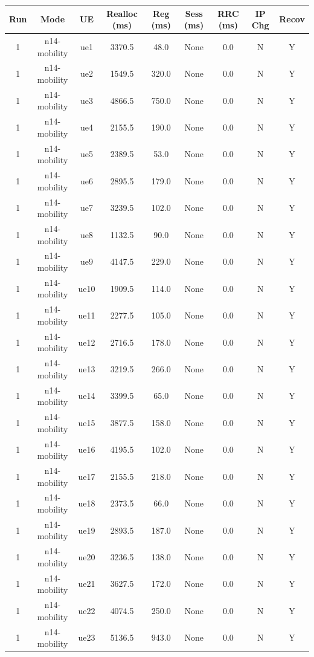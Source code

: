 \begin{table}[ht]
\centering
\begin{tabular}{|c|c|c|c|c|c|c|c|c|}
\hline
Run & Mode & UE & Realloc (ms) & Reg (ms) & Sess (ms) & RRC (ms) & IP Chg & Recov \\
\hline
1 & n14-mobility & ue1 & 3370.5 & 48.0 & None & 0.0 & N & Y \\
1 & n14-mobility & ue2 & 1549.5 & 320.0 & None & 0.0 & N & Y \\
1 & n14-mobility & ue3 & 4866.5 & 750.0 & None & 0.0 & N & Y \\
1 & n14-mobility & ue4 & 2155.5 & 190.0 & None & 0.0 & N & Y \\
1 & n14-mobility & ue5 & 2389.5 & 53.0 & None & 0.0 & N & Y \\
1 & n14-mobility & ue6 & 2895.5 & 179.0 & None & 0.0 & N & Y \\
1 & n14-mobility & ue7 & 3239.5 & 102.0 & None & 0.0 & N & Y \\
1 & n14-mobility & ue8 & 1132.5 & 90.0 & None & 0.0 & N & Y \\
1 & n14-mobility & ue9 & 4147.5 & 229.0 & None & 0.0 & N & Y \\
1 & n14-mobility & ue10 & 1909.5 & 114.0 & None & 0.0 & N & Y \\
1 & n14-mobility & ue11 & 2277.5 & 105.0 & None & 0.0 & N & Y \\
1 & n14-mobility & ue12 & 2716.5 & 178.0 & None & 0.0 & N & Y \\
1 & n14-mobility & ue13 & 3219.5 & 266.0 & None & 0.0 & N & Y \\
1 & n14-mobility & ue14 & 3399.5 & 65.0 & None & 0.0 & N & Y \\
1 & n14-mobility & ue15 & 3877.5 & 158.0 & None & 0.0 & N & Y \\
1 & n14-mobility & ue16 & 4195.5 & 102.0 & None & 0.0 & N & Y \\
1 & n14-mobility & ue17 & 2155.5 & 218.0 & None & 0.0 & N & Y \\
1 & n14-mobility & ue18 & 2373.5 & 66.0 & None & 0.0 & N & Y \\
1 & n14-mobility & ue19 & 2893.5 & 187.0 & None & 0.0 & N & Y \\
1 & n14-mobility & ue20 & 3236.5 & 138.0 & None & 0.0 & N & Y \\
1 & n14-mobility & ue21 & 3627.5 & 172.0 & None & 0.0 & N & Y \\
1 & n14-mobility & ue22 & 4074.5 & 250.0 & None & 0.0 & N & Y \\
1 & n14-mobility & ue23 & 5136.5 & 943.0 & None & 0.0 & N & Y \\

\end{tabular}
\end{table}
